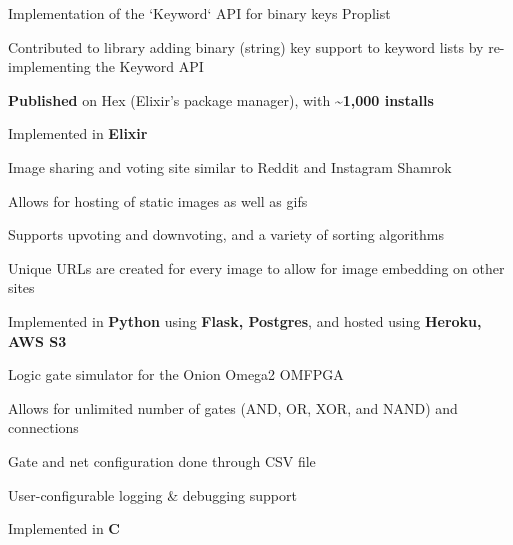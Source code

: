 

\begin{cventries}

    \cventry
    {Implementation of the `Keyword` API for binary keys} %
    {Proplist} %
    {}{}{
        \begin{cvitems} %
            \item {Contributed to library adding binary (string) key support to keyword lists by re-implementing the Keyword API}
            \item {\textbf{Published} on Hex (Elixir's package manager), with \textbf{\textasciitilde1,000 installs}}
            \item {Implemented in \textbf{Elixir}}
        \end{cvitems}
    }

    \cventry
    {Image sharing and voting site similar to Reddit and Instagram} %
    {Shamrok} %
    {}{}{
        \begin{cvitems} %
            \item {Allows for hosting of static images as well as gifs}
            \item {Supports upvoting and downvoting, and a variety of sorting algorithms}
            \item {Unique URLs are created for every image to allow for image embedding on other sites}
            \item {Implemented in \textbf{Python} using \textbf{Flask, Postgres}, and hosted using \textbf{Heroku, AWS S3}}
        \end{cvitems}
    }

    \cventry
    {Logic gate simulator for the Onion Omega2} %
    {OMFPGA} %
    {}{}{
        \begin{cvitems} %
            \item {Allows for unlimited number of gates (AND, OR, XOR, and NAND) and connections}
            \item {Gate and net configuration done through CSV file}
            \item {User-configurable logging \& debugging support}
            \item {Implemented in \textbf{C}}
        \end{cvitems}
    }


\end{cventries}
